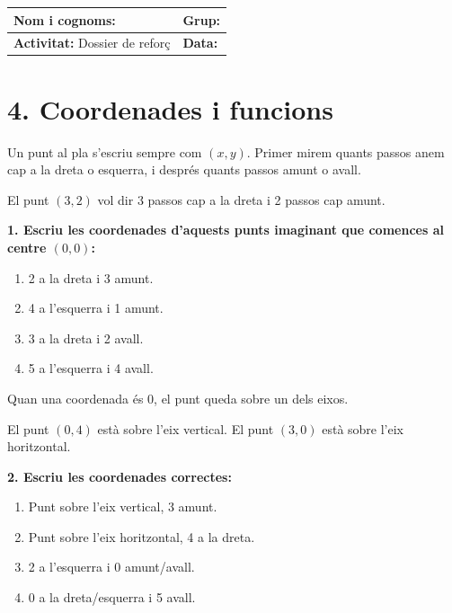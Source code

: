 \documentclass[12pt,a4paper]{article}
\begin{document}
\begingroup
\renewcommand{\arraystretch}{2}
\begin{tabularx}{\textwidth}{|X|p{4cm}|}
\hline
\textbf{Nom i cognoms:} & \textbf{Grup:} \\ \hline
\textbf{Activitat:} Dossier de reforç & \textbf{Data:} \\ \hline
\end{tabularx}
\endgroup

\vspace{0.5cm}

\section*{4. Coordenades i funcions}

\begin{capsula}
Un punt al pla s'escriu sempre com $(x,y)$. Primer mirem quants passos anem cap a la dreta o esquerra, i després quants passos amunt o avall.
\end{capsula}

\begin{exemple}
El punt $(3,2)$ vol dir 3 passos cap a la dreta i 2 passos cap amunt.
\end{exemple}

\textbf{1. Escriu les coordenades d'aquests punts imaginant que comences al centre $(0,0)$:}
\begin{enumerate}[label=\alph*)]
    \item 2 a la dreta i 3 amunt. \vspace{0.6cm}
    \item 4 a l'esquerra i 1 amunt. \vspace{0.6cm}
    \item 3 a la dreta i 2 avall. \vspace{0.6cm}
    \item 5 a l'esquerra i 4 avall. \vspace{0.6cm}
\end{enumerate}

\begin{capsula}
Quan una coordenada és 0, el punt queda sobre un dels eixos.
\end{capsula}

\begin{exemple}
El punt $(0,4)$ està sobre l'eix vertical. El punt $(3,0)$ està sobre l'eix horitzontal.
\end{exemple}

\textbf{2. Escriu les coordenades correctes:}
\begin{enumerate}[label=\alph*)]
    \item Punt sobre l'eix vertical, 3 amunt. \vspace{0.6cm}
    \item Punt sobre l'eix horitzontal, 4 a la dreta. \vspace{0.6cm}
    \item 2 a l'esquerra i 0 amunt/avall. \vspace{0.6cm}
    \item 0 a la dreta/esquerra i 5 avall. \vspace{0.6cm}
\end{enumerate}
\end{document}
